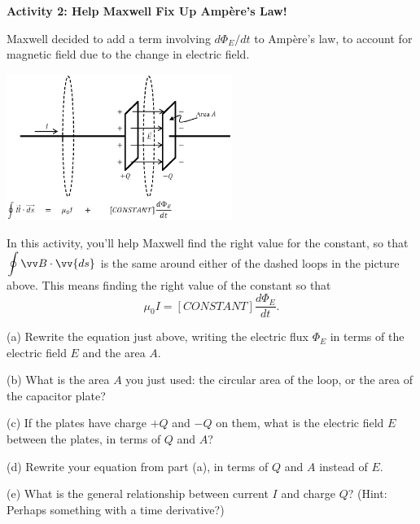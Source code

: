 \pagebreak
\textbf{Activity 2: Help Maxwell Fix Up Amp\`ere's Law!}

Maxwell decided to add a term involving $d\Phi_E/dt$ to Amp\`ere's law, to account for magnetic field due to the change in electric field.
\begin{center}
\vspace{-0.2in}
    \includegraphics[width=0.55\textwidth]{deriving_em_waves/two_loops_with_equation.eps}
\vspace{-0.1in}
\end{center}

In this activity, you'll help Maxwell find the right value for the constant, so that $\displaystyle \oint \vv B \cdot \vv{ds}$ is the same around either of the dashed loops in the picture above.  This means finding the right value of the constant so that
\begin{displaymath}
\mu_0I = [CONSTANT] \frac{d\Phi_E}{dt}.
\end{displaymath}

\vspace{-0.1in}
(a) Rewrite the equation just above, writing the electric flux $\Phi_E$ in terms of the electric field $E$ and the area $A$.
\vspace{0.4in}

(b) What is the area $A$ you just used: the circular area of the loop, or the area of the capacitor plate?
\vspace{0.3in}

(c) If the plates have charge $+Q$ and $-Q$ on them, what is the electric field $E$ between the plates, in terms of $Q$ and $A$?\label{part_ampere_field_between_plates}
\vspace{0.6in}

(d) Rewrite your equation from part (a), in terms of $Q$ and $A$ instead of $E$.
\vspace{0.5in}

(e) What is the general relationship between current $I$ and charge $Q$? (Hint: Perhaps something with a time derivative?)
\vspace{0.3in}

